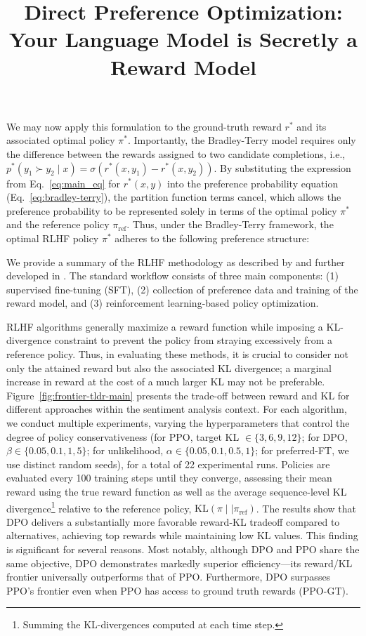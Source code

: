 \title{Direct Preference Optimization: Your Language Model is Secretly a Reward Model}
We may now apply this formulation to the ground-truth reward $r^*$ and its associated optimal policy $\pi^*$. Importantly, the Bradley-Terry model requires only the difference between the rewards assigned to two candidate completions, i.e., ${p^*(y_1 \succ y_2 \mid x) = \sigma(r^*(x, y_1) - r^*(x, y_2))}$. By substituting the expression from Eq.~\ref{eq:main_eq} for $r^*(x,y)$ into the preference probability equation (Eq.~\ref{eq:bradley-terry}), the partition function terms cancel, which allows the preference probability to be represented solely in terms of the optimal policy $\pi^*$ and the reference policy $\pi_\text{ref}$. Thus, under the Bradley-Terry framework, the optimal RLHF policy $\pi^*$ adheres to the following preference structure:

We provide a summary of the RLHF methodology as described by \citeauthor{ziegler2020finetuning} and further developed in \citep{stiennon2022learning, bai2022training, ouyang2022training}. The standard workflow consists of three main components: (1) supervised fine-tuning (SFT), (2) collection of preference data and training of the reward model, and (3) reinforcement learning-based policy optimization.

RLHF algorithms generally maximize a reward function while imposing a KL-divergence constraint to prevent the policy from straying excessively from a reference policy. Thus, in evaluating these methods, it is crucial to consider not only the attained reward but also the associated KL divergence; a marginal increase in reward at the cost of a much larger KL may not be preferable. Figure~\ref{fig:frontier-tldr-main} presents the trade-off between reward and KL for different approaches within the sentiment analysis context. For each algorithm, we conduct multiple experiments, varying the hyperparameters that control the degree of policy conservativeness (for PPO, target KL $\in\{3,6,9,12\}$; for DPO, $\beta \in \{0.05,0.1,1,5\}$; for unlikelihood, $\alpha\in\{0.05,0.1,0.5,1\}$; for preferred-FT, we use distinct random seeds), for a total of 22 experimental runs. Policies are evaluated every 100 training steps until they converge, assessing their mean reward using the true reward function as well as the average sequence-level KL divergence\footnote{Summing the KL-divergences computed at each time step.} relative to the reference policy, $\text{KL}\left(\pi\mid \mid \pi_\text{ref}\right)$. The results show that DPO delivers a substantially more favorable reward-KL tradeoff compared to alternatives, achieving top rewards while maintaining low KL values. This finding is significant for several reasons. Most notably, although DPO and PPO share the same objective, DPO demonstrates markedly superior efficiency—its reward/KL frontier universally outperforms that of PPO. Furthermore, DPO surpasses PPO’s frontier even when PPO has access to ground truth rewards (PPO-GT).

